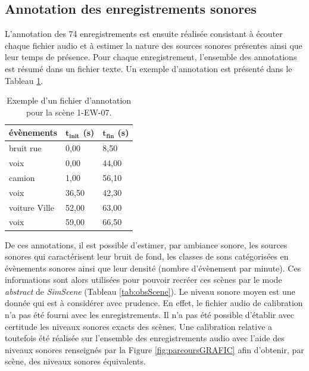 \subsection{Annotation des enregistrements sonores}\label{part:scene_annotation}

L'annotation des 74 enregistrements est ensuite réalisée consistant à écouter chaque fichier audio et à estimer la nature des sources sonores présentes ainsi que leur temps de présence. Pour chaque enregistrement, l'ensemble des annotations est résumé dans un fichier texte. Un exemple d'annotation est présenté dans le Tableau \ref{tab:exemple_annotation}.\\

\begin{table}[h]
\caption{Exemple d'un fichier d'annotation pour la scène 1-EW-07.}
\centering
\begin{tabular}{lll}
\textbf{évènements}    & $\mathbf{t_{init}}$ \textbf{(s)} & $\mathbf{t_{fin}}$ \textbf{(s)} \\ \toprule
bruit rue     & 0,00            & 8,50           \\
\rowcolor[HTML]{C0C0C0}
voix          & 0,00            & 44,00          \\
camion        & 1,00            & 56,10          \\
\rowcolor[HTML]{C0C0C0}
voix          & 36,50           & 42,30          \\
voiture Ville & 52,00          & 63,00          \\
\rowcolor[HTML]{C0C0C0}
voix          & 59,00           & 66,50         \\ \bottomrule
\end{tabular}
\label{tab:exemple_annotation}
\end{table}



De ces annotations, il est possible d'estimer, par ambiance sonore, les sources sonores qui caractérisent leur bruit de fond, les classes de sons catégorisées en évènements sonores ainsi que leur densité (nombre d'évènement par minute). Ces informations sont alors utilisées pour pouvoir recréer ces scènes par le mode \textit{abstract} de \textit{SimScene} (Tableau \ref{tab:obsScene}). Le niveau sonore moyen est une donnée qui est à considérer avec prudence. En effet, le fichier audio de calibration n'a pas été fourni avec les enregistrements. Il n'a pas été possible d'établir avec certitude les niveaux sonores exacts des scènes. Une calibration relative a toutefois été réalisée sur l'ensemble des enregistrements audio avec l'aide des niveaux sonores renseignés par la Figure \ref{fig:parcoursGRAFIC} afin d'obtenir, par scène, des niveaux sonores équivalents.\\

